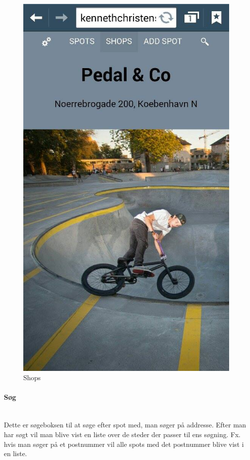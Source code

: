 \documentclass[12pt]{article}
\begin{document}
\begin{figure}[ht]
\begin{minipage}[b]{0.45\linewidth}
\includegraphics[width=\textwidth]{shops}
\caption{Shops}
\label{fig:figure6}
\end{minipage}
\end{figure}



\paragraph{Søg}\mbox{}\\
Dette er søgeboksen til at søge efter spot med, man søger på addresse. Efter man har søgt vil man blive vist en liste over de steder der passer til ens søgning. Fx. hvis man søger på et postnummer vil alle spots med det postnummer blive vist i en liste.\\
\end{document}
